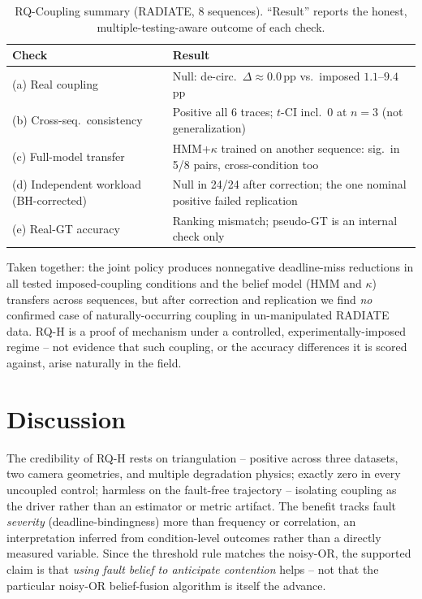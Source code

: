\documentclass[conference]{IEEEtran}
\begin{document}
\begin{table}[htbp]
\caption{RQ-Coupling summary (RADIATE, 8 sequences). ``Result''
reports the honest, multiple-testing-aware outcome of each check.}
\label{tab:coupling}
\centering
\scriptsize
\setlength{\tabcolsep}{3pt}
\begin{tabular}{p{2.3cm}p{3.7cm}}
\toprule
\textbf{Check} & \textbf{Result} \\
\midrule
(a) Real coupling & Null: de-circ.\ $\Delta\approx0.0$\,pp vs.\ imposed $1.1$--$9.4$\,pp \\
(b) Cross-seq.\ consistency & Positive all 6 traces; $t$-CI incl.\ 0 at $n{=}3$ (not generalization) \\
(c) Full-model transfer & HMM+$\kappa$ trained on another sequence: sig.\ in 5/8 pairs, cross-condition too \\
(d) Independent workload (BH-corrected) & Null in 24/24 after correction; the one nominal positive failed replication \\
(e) Real-GT accuracy & Ranking mismatch; pseudo-GT is an internal check only \\
\bottomrule
\end{tabular}
\end{table}

Taken together: the joint policy produces nonnegative deadline-miss
reductions in all tested imposed-coupling conditions and the belief
model (HMM and $\kappa$) transfers across sequences, but after
correction and replication we
find \emph{no} confirmed case of naturally-occurring coupling in
un-manipulated RADIATE data. RQ-H is a proof of mechanism under a
controlled, experimentally-imposed regime -- not evidence that such
coupling, or the accuracy differences it is scored against, arise
naturally in the field.

\section{Discussion}
\label{sec:discussion}

The credibility of RQ-H rests on triangulation -- positive across
three datasets, two camera geometries, and multiple degradation
physics; exactly zero in every uncoupled control; harmless on the
fault-free trajectory -- isolating coupling as the driver rather than
an estimator or metric artifact. The benefit tracks fault
\emph{severity} (deadline-bindingness) more than frequency or
correlation, an interpretation inferred from condition-level outcomes
rather than a directly measured variable. Since the threshold rule
matches the noisy-OR, the supported claim is that \emph{using fault
belief to anticipate contention} helps -- not that the particular
noisy-OR belief-fusion algorithm is itself the advance.
\end{document}
